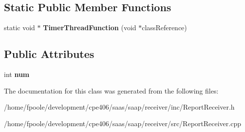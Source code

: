 \subsection*{Static Public Member Functions}
\begin{DoxyCompactItemize}
\item 
\hypertarget{class_report_receiver_a3295f9176b8bf9d868c58ad457c784c6}{}static void $\ast$ {\bfseries Timer\+Thread\+Function} (void $\ast$class\+Reference)\label{class_report_receiver_a3295f9176b8bf9d868c58ad457c784c6}

\end{DoxyCompactItemize}
\subsection*{Public Attributes}
\begin{DoxyCompactItemize}
\item 
\hypertarget{class_report_receiver_afba9e4570f6fa84126432dbfa1210053}{}int {\bfseries num}\label{class_report_receiver_afba9e4570f6fa84126432dbfa1210053}

\end{DoxyCompactItemize}


The documentation for this class was generated from the following files\+:\begin{DoxyCompactItemize}
\item 
/home/fpoole/development/cpe406/saas/saap/receiver/inc/Report\+Receiver.\+h\item 
/home/fpoole/development/cpe406/saas/saap/receiver/src/Report\+Receiver.\+cpp\end{DoxyCompactItemize}
